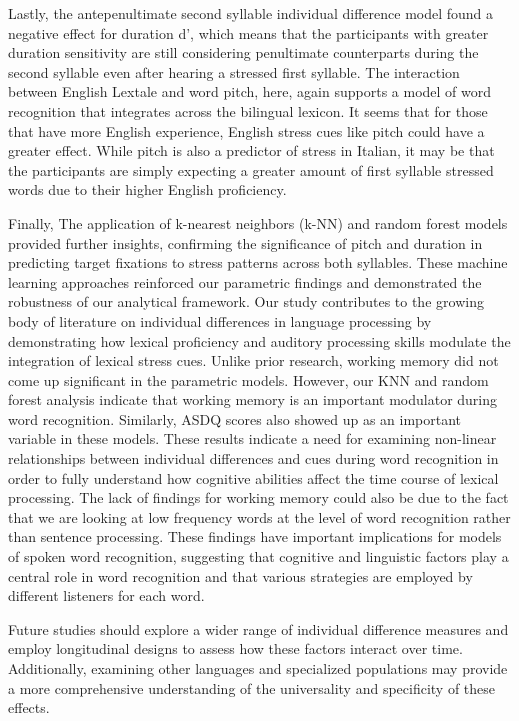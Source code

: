 Lastly, the antepenultimate second syllable individual difference model found a negative effect for duration d', which means that the participants with greater duration sensitivity are still considering penultimate counterparts during the second syllable even after hearing a stressed first syllable. The interaction between English Lextale and word pitch, here, again supports a model of word recognition that integrates across the bilingual lexicon. It seems that for those that have more English experience, English stress cues like pitch could have a greater effect. While pitch is also a predictor of stress in Italian, it may be that the participants are simply expecting a greater amount of first syllable stressed words due to their higher English proficiency.

Finally, The application of k-nearest neighbors (k-NN) and random forest models provided further insights, confirming the significance of pitch and duration in predicting target fixations to stress patterns across both syllables. These machine learning approaches reinforced our parametric findings and demonstrated the robustness of our analytical framework. Our study contributes to the growing body of literature on individual differences in language processing by demonstrating how lexical proficiency and auditory processing skills modulate the integration of lexical stress cues. Unlike prior research, working memory did not come up significant in the parametric models. However, our KNN and random forest analysis indicate that working memory is an important modulator during word recognition. Similarly, ASDQ scores also showed up as an important variable in these models. These results indicate a need for examining non-linear relationships between individual differences and cues during word recognition in order to fully understand how cognitive abilities affect the time course of lexical processing. The lack of findings for working memory could also be due to the fact that we are looking at low frequency words at the level of word recognition rather than sentence processing. These findings have important implications for models of spoken word recognition, suggesting that cognitive and linguistic factors play a central role in word recognition and that various strategies are employed by different listeners for each word.

Future studies should explore a wider range of individual difference measures and employ longitudinal designs to assess how these factors interact over time. Additionally, examining other languages and specialized populations may provide a more comprehensive understanding of the universality and specificity of these effects.